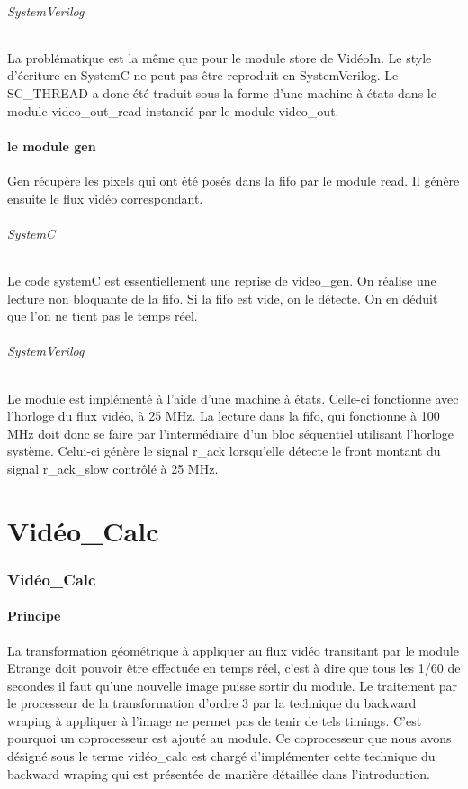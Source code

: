 {\paragraph{SystemVerilog}
La problématique est la même que pour le module store de VidéoIn. 
Le style d'écriture en SystemC ne peut pas être reproduit en SystemVerilog.
Le SC\_THREAD a donc été traduit sous la forme d'une machine à états dans le module video\_out\_read instancié par le module video\_out.

\subsection{le module gen}
Gen récupère les pixels qui ont été posés dans la fifo par le module read.
Il génère ensuite le flux vidéo correspondant.

\paragraph{SystemC}
Le code systemC est essentiellement une reprise de video\_gen.
On réalise une lecture non bloquante de la fifo. 
Si la fifo est vide, on le détecte. 
On en déduit que l'on ne tient pas le temps réel.

\paragraph{SystemVerilog}
Le module est implémenté à l'aide d'une machine à états.
Celle-ci fonctionne avec l'horloge du flux vidéo, à 25 MHz.
La lecture dans la fifo, qui fonctionne à 100 MHz doit donc se faire
par l'intermédiaire d'un bloc séquentiel utilisant l'horloge système.
Celui-ci génère le signal r\_ack lorsqu'elle détecte le front montant
du signal r\_ack\_slow contrôlé à 25 MHz.






    \part{Vidéo\_Calc} 
    \section*{Vidéo\_Calc}
    
    \subsection{Principe}
{La transformation géométrique à appliquer au flux vidéo transitant par le module Etrange doit pouvoir être effectuée en temps réel, c'est à dire que tous les 1/60 de secondes il faut qu'une nouvelle image puisse sortir du module. Le traitement par le processeur de la transformation d'ordre 3 par la technique du backward wraping  à appliquer à l'image ne permet pas de tenir de tels timings. C'est pourquoi un coprocesseur est ajouté au module. Ce coprocesseur que nous avons désigné sous le terme vidéo\_calc est chargé d'implémenter cette technique du backward wraping qui est présentée de manière détaillée dans l'introduction.



}}
